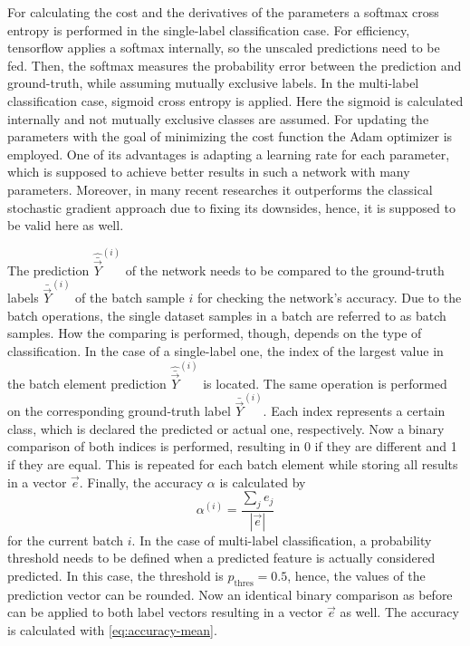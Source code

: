For calculating the cost and the derivatives of the parameters a softmax cross entropy is performed in the single-label classification case.
For efficiency, tensorflow applies a softmax internally, so the unscaled predictions need to be fed.
Then, the softmax measures the probability error between the prediction and ground-truth, while assuming mutually exclusive labels.
In the multi-label classification case, sigmoid cross entropy is applied.
Here the sigmoid is calculated internally and not mutually exclusive classes are assumed.
For updating the parameters with the goal of minimizing the cost function the Adam optimizer is employed.
One of its advantages is adapting a learning rate for each parameter, which is supposed to achieve better results in such a network with many parameters.
Moreover, in many recent researches it outperforms the classical stochastic gradient approach due to fixing its downsides, hence, it is supposed to be valid here as well.

The prediction $\hat{\bar{\vec{Y}}}^{(i)}$ of the network needs to be compared to the ground-truth labels $\bar{\vec{Y}}^{(i)}$ of the batch sample $i$ for checking the network's accuracy.
Due to the batch operations, the single dataset samples in a batch are referred to as batch samples.
How the comparing is performed, though, depends on the type of classification.
In the case of a single-label one, the index of the largest value in the batch element prediction $\hat{\bar{\vec{Y}}}^{(i)}$ is located.
The same operation is performed on the corresponding ground-truth label $\bar{\vec{Y}}^{(i)}$.
Each index represents a certain class, which is declared the predicted or actual one, respectively.
Now a binary comparison of both indices is performed, resulting in 0 if they are different and 1 if they are equal.
This is repeated for each batch element while storing all results in a vector $\vec{e}$.
Finally, the accuracy $\alpha$ is calculated by
\begin{equation}
	\label{eq:accuracy-mean}
	\alpha^{(i)} = \frac{\sum_{j} e_j}{|\vec{e}|}
\end{equation}
for the current batch $i$.
In the case of multi-label classification, a probability threshold needs to be defined when a predicted feature is actually considered predicted.
In this case, the threshold is $p_{\text{thres}}=0.5$, hence, the values of the prediction vector can be rounded.
Now an identical binary comparison as before can be applied to both label vectors resulting in a vector $\vec{e}$ as well.
The accuracy is calculated with \eqref{eq:accuracy-mean}.

